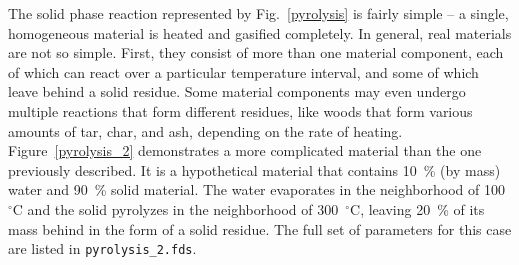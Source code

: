 \documentclass[11pt]{book}
\newcommand{\ct}{\tt\small}
\begin{document}
The solid phase reaction represented by Fig.~\ref{pyrolysis} is fairly simple -- a single, homogeneous material is
heated and gasified completely.
In general, real materials are not so simple. First, they consist of more than one material component, each of which can
react over a particular
temperature interval, and some of which leave behind a solid residue.
Some material components may even undergo multiple reactions that
form different residues, like woods that form various amounts of tar, char, and ash, depending on the rate of heating.
Figure~\ref{pyrolysis_2} demonstrates a more complicated material than the one previously described.
It is a hypothetical material that
contains 10~\% (by mass) water and 90~\% solid material. The water evaporates in the neighborhood of 100~$^\circ$C and the
solid pyrolyzes in the
neighborhood of 300~$^\circ$C, leaving 20~\% of its mass behind in the form of a solid residue. The full set of parameters for this case are listed in {\ct pyrolysis\_2.fds}.
\end{document}
